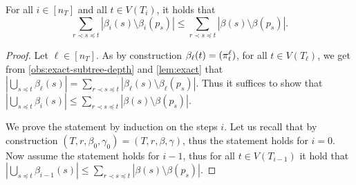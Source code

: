 \documentclass{lmcs}
\theoremstyle{plain}\newtheorem{claim}[thm]{Claim}   %
\let\boundary\relax
\newcommand{\boundary}{\Delta}
\begin{document}
\begin{lem}
	\label{lem:depth}
	For all $i\in[n_T]$ and all $t\in V(T_i)$, it holds that
	\begin{equation*}
		\sum_{r\prec s \preceq t} |\beta_i(s) \setminus \beta_i(p_s)|\leq \sum_{r\prec s \preceq t} |\beta(s) \setminus \beta(p_s)|.
	\end{equation*}
\end{lem}

\begin{proof}
	Let $\ell\in[n_T]$.
	As by construction $\beta_\ell(t)=\boundary(\pi^\ell_t)$, for all $t\in V(T_\ell)$, we get from \autoref{obs:exact-subtree-depth} and \autoref{lem:exact} that $|\bigcup_{s \preceq t} \beta_\ell(s)| = \sum_{r\prec s \preceq t} |\beta_\ell(s) \setminus \beta_\ell(p_s)|$.
	Thus it suffices to show that $|\bigcup_{s \preceq t} \beta_i(s)| \leq \sum_{r\prec s \preceq t} |\beta(s) \setminus \beta(p_s)|.$
	
	We prove the statement by induction on the steps $i$.
	Let us recall that by construction $(T,r,\beta_0,\gamma_0)=(T,r,\beta,\gamma)$, thus the statement holds for $i=0$.
	Now assume the statement holds for $i-1$, thus for all $t\in V(T_{i-1})$ it hold that  $|\bigcup_{s \preceq t} \beta_{i-1}(s)| \leq \sum_{r\prec s \preceq t} |\beta(s) \setminus \beta(p_s)|.$
	

\end{proof}
\end{document}
